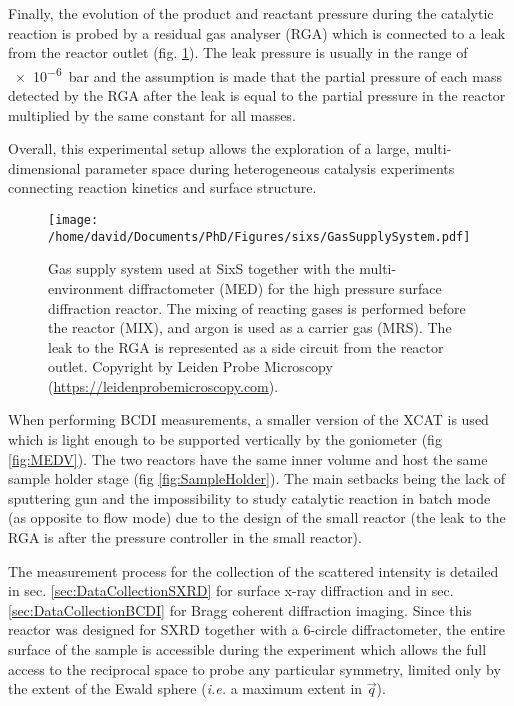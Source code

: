 Finally, the evolution of the product and reactant pressure during the catalytic reaction is probed by a residual gas analyser (RGA) which is connected to a leak from the reactor outlet (fig. \ref{fig:GasSupplySystem}).
The leak pressure is usually in the range of \qty{e-6}{\bar} and the assumption is made that the partial pressure of each mass detected by the RGA after the leak is equal to the partial pressure in the reactor multiplied by the same constant for all masses.

Overall, this experimental setup allows the exploration of a large, multi-dimensional parameter space during heterogeneous catalysis experiments connecting reaction kinetics and surface structure.

\begin{figure}[!htb]
    \centering
    \texttt{[image: /home/david/Documents/PhD/Figures/sixs/GasSupplySystem.pdf]}
    \caption{
    	Gas supply system used at SixS together with the multi-environment diffractometer (MED) for the high pressure surface diffraction reactor.
    	The mixing of reacting gases is performed before the reactor (MIX), and argon is used as a carrier gas (MRS).
    	The leak to the RGA is represented as a side circuit from the reactor outlet.
    	Copyright by Leiden Probe Microscopy (\url{https://leidenprobemicroscopy.com}).
    }
    \label{fig:GasSupplySystem}
\end{figure}

When performing BCDI measurements, a smaller version of the XCAT is used which is light enough to be supported vertically by the goniometer (fig \ref{fig:MEDV}).
The two reactors have the same inner volume and host the same sample holder stage (fig \ref{fig:SampleHolder}).
The main setbacks being the lack of sputtering gun and the impossibility to study catalytic reaction in batch mode (as opposite to flow mode) due to the design of the small reactor (the leak to the RGA is after the pressure controller in the small reactor).

The measurement process for the collection of the scattered intensity is detailed in sec. \ref{sec:DataCollectionSXRD} for surface x-ray diffraction and in sec. \ref{sec:DataCollectionBCDI} for Bragg coherent diffraction imaging.
Since this reactor was designed for SXRD together with a 6-circle diffractometer, the entire surface of the sample is accessible during the experiment which allows the full access to the reciprocal space to probe any particular symmetry, limited only by the extent of the Ewald sphere (\textit{i.e.} a maximum extent in $\vec{q}$).

